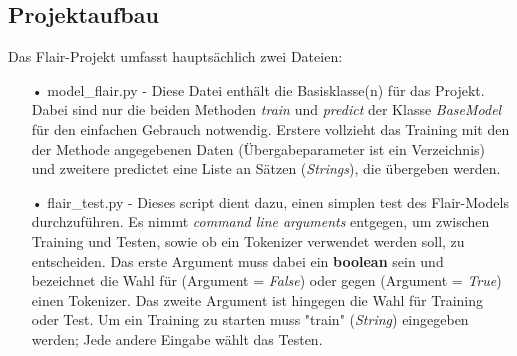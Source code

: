 \documentclass[10pt,a4paper]{article}
\begin{document}
\subsection{Projektaufbau}
\begin{flushleft}
Das Flair-Projekt umfasst hauptsächlich zwei Dateien:
\end{flushleft}
\begin{itemize}
\item[•] model\_flair.py - Diese Datei enthält die Basisklasse(n) für das Projekt. Dabei sind nur die beiden Methoden \textit{train} und \textit{predict} der Klasse \textit{BaseModel} für den einfachen Gebrauch notwendig. Erstere vollzieht das Training mit den der Methode angegebenen Daten (Übergabeparameter ist ein Verzeichnis) und zweitere predictet eine Liste an Sätzen (\textit{Strings}), die übergeben werden.
\item[•] flair\_test.py - Dieses script dient dazu, einen simplen test des Flair-Models durchzuführen. Es nimmt \textit{command line arguments} entgegen, um zwischen Training und Testen, sowie ob ein Tokenizer verwendet werden soll, zu entscheiden. Das erste Argument muss dabei ein \textbf{boolean} sein und bezeichnet die Wahl für (Argument = \textit{False}) oder gegen (Argument = \textit{True}) einen Tokenizer. Das zweite Argument ist hingegen die Wahl für Training oder Test. Um ein Training zu starten muss "train" (\textit{String}) eingegeben werden; Jede andere Eingabe wählt das Testen.
\end{itemize}
\end{document}
